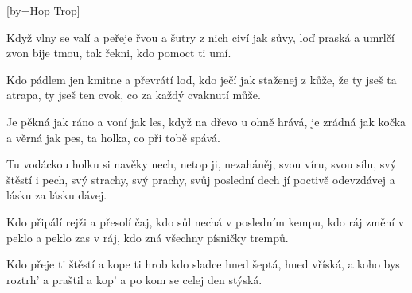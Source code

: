[by={Hop Trop}]

\beginverse{}
Když vlny se valí a peřeje řvou
a šutry z nich civí jak sůvy,
loď praská a umrlčí zvon bije tmou,
tak řekni, kdo pomoct ti umí.
\endverse{}

\beginverse*{}
Kdo pádlem jen kmitne a převrátí loď,
kdo ječí jak staženej z kůže,
že ty jseš ta atrapa, ty jseš ten cvok,
co za každý cvaknutí může.
\endverse{}

\beginverse{}
\chordsoff{}
Je pěkná jak ráno a voní jak les,
když na dřevo u ohně hrává,
je zrádná jak kočka a věrná jak pes,
ta holka, co při tobě spává.
\chordson{}
\endverse{}

\beginchorus{}
Tu vodáckou holku si navěky nech,
netop ji, nezaháněj,
svou víru, svou sílu, svý štěstí i pech,
svý strachy, svý prachy, svůj poslední dech
jí poctivě odevzdávej
a lásku za lásku dávej.
\endchorus{}

\beginverse{}
\chordsoff{}
Kdo připálí rejži a přesolí čaj,
kdo sůl nechá v posledním kempu,
kdo ráj změní v peklo a peklo zas v ráj,
kdo zná všechny písničky trempů.
\chordson{}
\endverse{}

\beginverse*{}
Kdo přeje ti štěstí a kope ti hrob
kdo sladce hned šeptá, hned vříská,
a koho bys roztrh' a praštil a kop'
a po kom se celej den stýská.
\endverse{}

